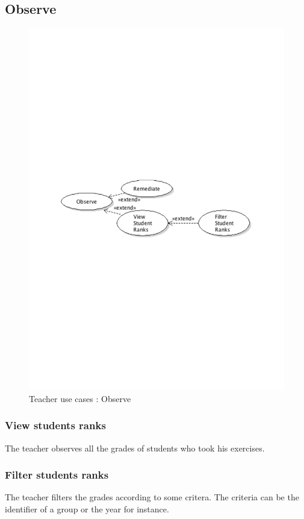 	\subsection{Observe}
		\begin{figure}[ht]
			\begin{center}
				\includegraphics[width=\textwidth,  trim=2cm 12cm 2cm 12cm]{UML_figure/UC/teacher/UC_Teacher_Observe.pdf}
				\caption{Teacher use cases : Observe}
			\end{center}
		\end{figure}
		\subsubsection{View students ranks}
			The teacher observes all the grades of students who took his exercises.
		\subsubsection{Filter students ranks}
			The teacher filters the grades according to some critera.
			The criteria can be the identifier of a group or the year for instance.
